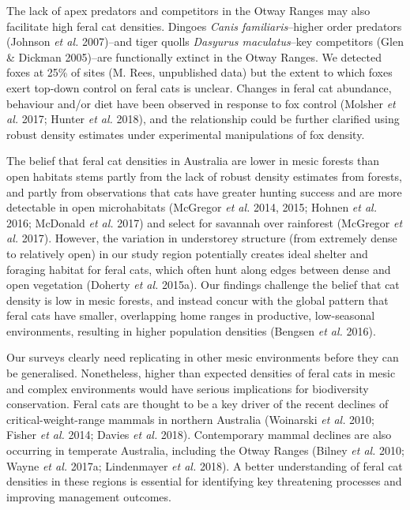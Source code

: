 \documentclass[11pt,a4paper,titlepage,twoside,openright]{style/unimelbthesis}
\begin{document}
\begin{mainmatter}
The lack of apex predators and competitors in the Otway Ranges may also facilitate high feral cat densities. Dingoes \emph{Canis familiaris}--higher order predators (Johnson \emph{et al.} 2007)--and tiger quolls \emph{Dasyurus maculatus}--key competitors (Glen \& Dickman 2005)--are functionally extinct in the Otway Ranges. We detected foxes at 25\% of sites (M. Rees, unpublished data) but the extent to which foxes exert top-down control on feral cats is unclear. Changes in feral cat abundance, behaviour and/or diet have been observed in response to fox control (Molsher \emph{et al.} 2017; Hunter \emph{et al.} 2018), and the relationship could be further clarified using robust density estimates under experimental manipulations of fox density.

The belief that feral cat densities in Australia are lower in mesic forests than open habitats stems partly from the lack of robust density estimates from forests, and partly from observations that cats have greater hunting success and are more detectable in open microhabitats (McGregor \emph{et al.} 2014, 2015; Hohnen \emph{et al.} 2016; McDonald \emph{et al.} 2017) and select for savannah over rainforest (McGregor \emph{et al.} 2017). However, the variation in understorey structure (from extremely dense to relatively open) in our study region potentially creates ideal shelter and foraging habitat for feral cats, which often hunt along edges between dense and open vegetation (Doherty \emph{et al.} 2015a). Our findings challenge the belief that cat density is low in mesic forests, and instead concur with the global pattern that feral cats have smaller, overlapping home ranges in productive, low-seasonal environments, resulting in higher population densities (Bengsen \emph{et al.} 2016).

Our surveys clearly need replicating in other mesic environments before they can be generalised. Nonetheless, higher than expected densities of feral cats in mesic and complex environments would have serious implications for biodiversity conservation. Feral cats are thought to be a key driver of the recent declines of critical-weight-range mammals in northern Australia (Woinarski \emph{et al.} 2010; Fisher \emph{et al.} 2014; Davies \emph{et al.} 2018). Contemporary mammal declines are also occurring in temperate Australia, including the Otway Ranges (Bilney \emph{et al.} 2010; Wayne \emph{et al.} 2017a; Lindenmayer \emph{et al.} 2018). A better understanding of feral cat densities in these regions is essential for identifying key threatening processes and improving management outcomes.


\end{mainmatter}
\end{document}
